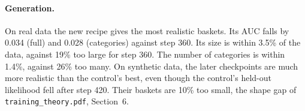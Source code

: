 \documentclass[11pt]{article}
\begin{document}
\paragraph{Generation.}
\begin{center}\small
{}
\end{center}
On real data the new recipe gives the most realistic baskets. Its AUC falls by 0.034 (full) and
0.028 (categories) against step 360. Its size is within 3.5\% of the data, against 19\% too large
for step 360. The number of categories is within 1.4\%, against 26\% too many. On synthetic data,
the later checkpoints are much more realistic than the control's best, even though the control's
held-out likelihood fell after step 420. Their baskets are 10\% too small, the shape gap of
\texttt{training\_theory.pdf}, Section~6.
\end{document}
